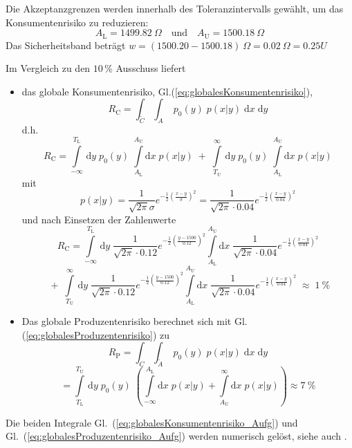 Die Akzeptanzgrenzen werden innerhalb des Toleranzintervalls gewählt, um das
Konsumentenrisiko zu reduzieren:
\[
A_\mathrm{L} = 1499.82~\Omega \quad \textrm{und} \quad A_\mathrm{U} = 1500.18~\Omega
\]
Das Sicherheitsband beträgt $w = (1500.20-1500.18)~\Omega = 0.02~\Omega = 0.25 U$

Im Vergleich zu den $10 \, \%$ Ausschuss liefert
\begin{itemize}
\item das globale Konsumentenrisiko, Gl.(\ref{eq:globalesKonsumentenrisiko}),
\begin{equation}
	R_\mathrm{C} =  \int_{\tilde C} \int_{A} \; p_0(y) \; p(x|y) \;\mathrm{d}x\; \mathrm{d}y
	\label{eq:globalesKonsumentenrisiko_Aufg}
\end{equation}
d.h.
$$
R_\mathrm{C} =  \int\limits_{-\infty}^{T_\mathrm{L}} \, \mathrm{d}y\; p_0(y) \;
 \int\limits_{A_\mathrm{L}}^{A_\mathrm{U}} \mathrm{d}x \; p(x|y) \; + \;
 \int\limits_{T_\mathrm{U}}^{\infty} \, \mathrm{d}y\; p_0(y) \;
  \int\limits_{A_\mathrm{L}}^{A_\mathrm{U}} \mathrm{d}x \; p(x|y)
$$
mit
\begin{equation}
	p(x|y) =\frac{1}{\sqrt{2 \pi} \sigma}
	e^{-\frac{1}{2}\left(\frac{x - y}{\sigma}\right)^2} =
	\frac{1}{\sqrt{2 \pi} \cdot 0.04}
		e^{-\frac{1}{2}\left(\frac{x - y}{0.04}\right)^2}
\end{equation}
und nach Einsetzen der Zahlenwerte
$$
 R_\mathrm{C} = \int\limits_{-\infty}^{T_\mathrm{L}} \, \mathrm{d}y\;
 \frac{1}{\sqrt{2 \pi} \cdot 0.12}
 e^{-\frac{1}{2}\left(\frac{y - 1500}{0.12}\right)^2}
 \int\limits_{A_\mathrm{L}}^{A_\mathrm{U}} \mathrm{d}x \;
 \frac{1}{\sqrt{2 \pi} \cdot 0.04}
   e^{-\frac{1}{2}\left(\frac{x - y}{0.04}\right)^2}
$$
$$
   \; + \;
   \int\limits_{T_\mathrm{U}}^{\infty} \, \mathrm{d}y\;
  \frac{1}{\sqrt{2 \pi} \cdot 0.12}
  e^{-\frac{1}{2}\left(\frac{y - 1500}{0.12}\right)^2}
  \int\limits_{A_\mathrm{L}}^{A_\mathrm{U}} \mathrm{d}x \;
  \frac{1}{\sqrt{2 \pi} \cdot 0.04}
    e^{-\frac{1}{2}\left(\frac{x - y}{0.04}\right)^2}
  \; \approx \; 1~\%
$$
\item Das globale Produzentenrisiko berechnet sich mit Gl.(\ref{eq:globalesProduzentenrisiko}) zu
\begin{equation}
	R_\mathrm{P} =  \int_{C} \int_{\tilde A} \; p_0(y) \; p(x|y) \; \mathrm{d}x\; \mathrm{d}y
  \label{eq:globalesProduzentenrisiko_Aufg}
\end{equation}
$$
	=  \int\limits_{T_\mathrm{L}}^{T_\mathrm{U}} \, \mathrm{d}y\; p_0(y) \;
 \left(\int\limits_{-\infty}^{A_\mathrm{L}} \mathrm{d}x \; p(x|y)
 + \int\limits_{A_\mathrm{U}}^{\infty} \mathrm{d}x \; p(x|y) \right)  \approx 7~\%
$$
\end{itemize}
Die beiden Integrale Gl.~(\ref{eq:globalesKonsumentenrisiko_Aufg})
und Gl.~(\ref{eq:globalesProduzentenrisiko_Aufg}) werden numerisch gelöst,
siehe auch \cite{JCGM106}.

